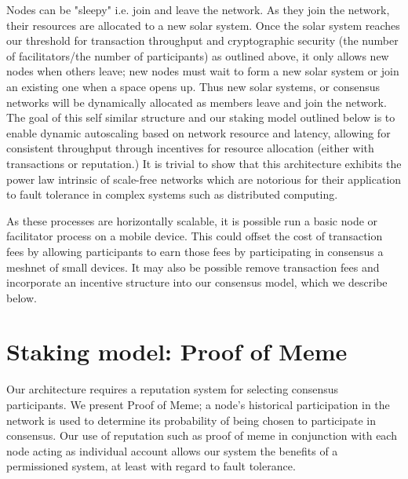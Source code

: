\documentclass{article}
\begin{document}
Nodes can be "sleepy" i.e. join and leave the network. As they join the network, their resources are allocated to a new solar system. Once the solar system reaches our threshold for transaction throughput and cryptographic security (the number of facilitators/the number of participants) as outlined above, it only allows new nodes when others leave; new nodes must wait to form a new solar system or join an existing one when a space opens up. Thus new solar systems, or consensus networks will be dynamically allocated as members leave and join the network. The goal of this self similar structure and our staking model outlined below is to enable dynamic autoscaling based on network resource and latency, allowing for consistent throughput through incentives for resource allocation (either with transactions or reputation.) It is trivial to show that this architecture exhibits the power law intrinsic of scale-free networks which are notorious for their application to fault tolerance in complex systems such as distributed computing.

As these processes are horizontally scalable, it is possible run a basic node or facilitator process on a mobile device. This could offset the cost of transaction fees by allowing participants to earn those fees by participating in consensus a meshnet of small devices. It may also be possible remove transaction fees and incorporate an incentive structure into our consensus model, which we describe below.

\section{Staking model: Proof of Meme}
Our architecture requires a reputation system for selecting consensus participants. We present Proof of Meme; a node's historical participation in the network is used to determine its probability of being chosen to participate in consensus. Our use of reputation such as proof of meme in conjunction with each node acting as individual account allows our system the benefits of a permissioned system, at least with regard to fault tolerance.
\end{document}
